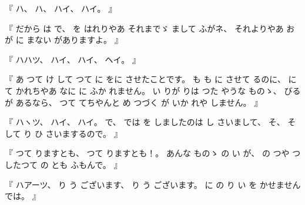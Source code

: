 %
『
ハ、
%
ハ、
%
ハイ、
%
ハイ。
』

%
『
だから
は
で、
%
を
はれりやあ
それまでゞ
まして
ふがネ、
%
それよりやあ
お
が
に
まない
がありますよ。
』

%
『
ハハツ、
%
ハイ、
%
ハイ、
%
ヘイ。
』

%
『
あ
つて
け
して
つて
に
をに%
させたことです。
%
%
も
も
に
させて
るのに、
%
に
て
かれちやあ
なに
に%
ふか
れません。
%
い
りが
りは
つた
やうな
ものゝ、
%
びる
が
あるなら、
%
つて
てちやんと
め
つづく%
が
いか
れや
しません。
』

%
『
ハヽツ、
%
ハイ、
%
ハイ。
%
で、
%
では
を
しましたのは
し
さいまして、
%
そ、
%
そして
り
ひ
さいまするので。
』

%
『
つて
りますとも、
%
つて
りますとも！。
%
あんな
ものゝ
の
い
が、
%
の
つや
つ
したつて
の
とも
ふもんで。
』

%
『
ハアーツ、
%
り
う
ございます、
%
り
う
ございます。
%
に
の
り
い
を
かせませんでは。
』

